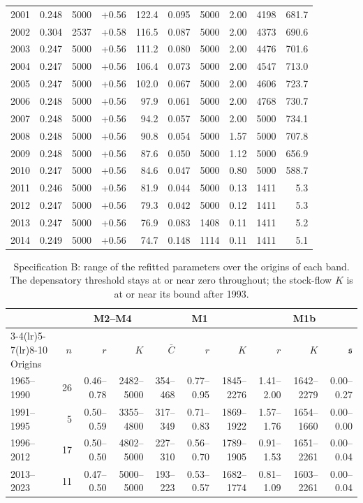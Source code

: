 \documentclass[preprint,11pt,authoryear]{elsarticle}
\theoremstyle{remark}
\newcommand{\sA}{\mathfrak{s}}
\begin{document}
\begin{table}[!htb]
\begin{tabular}{@{}lrrrrrrrrr@{}}
2001 & 0.248 & 5000 & +0.56 & 122.4 & 0.095 & 5000 & 2.00 & 4198 & 681.7 \\
2002 & 0.304 & 2537 & +0.58 & 116.5 & 0.087 & 5000 & 2.00 & 4373 & 690.6 \\
2003 & 0.247 & 5000 & +0.56 & 111.2 & 0.080 & 5000 & 2.00 & 4476 & 701.6 \\
2004 & 0.247 & 5000 & +0.56 & 106.4 & 0.073 & 5000 & 2.00 & 4547 & 713.0 \\
2005 & 0.247 & 5000 & +0.56 & 102.0 & 0.067 & 5000 & 2.00 & 4606 & 723.7 \\
2006 & 0.248 & 5000 & +0.56 & 97.9 & 0.061 & 5000 & 2.00 & 4768 & 730.7 \\
2007 & 0.248 & 5000 & +0.56 & 94.2 & 0.057 & 5000 & 2.00 & 5000 & 734.1 \\
2008 & 0.248 & 5000 & +0.56 & 90.8 & 0.054 & 5000 & 1.57 & 5000 & 707.8 \\
2009 & 0.248 & 5000 & +0.56 & 87.6 & 0.050 & 5000 & 1.12 & 5000 & 656.9 \\
2010 & 0.247 & 5000 & +0.56 & 84.6 & 0.047 & 5000 & 0.80 & 5000 & 588.7 \\
2011 & 0.246 & 5000 & +0.56 & 81.9 & 0.044 & 5000 & 0.13 & 1411 & 5.3 \\
2012 & 0.247 & 5000 & +0.56 & 79.3 & 0.042 & 5000 & 0.12 & 1411 & 5.3 \\
2013 & 0.247 & 5000 & +0.56 & 76.9 & 0.083 & 1408 & 0.11 & 1411 & 5.2 \\
2014 & 0.249 & 5000 & +0.56 & 74.7 & 0.148 & 1114 & 0.11 & 1411 & 5.1 \\
\bottomrule
\end{tabular}
\end{table}

\begin{table}[!htb]
\centering\scriptsize
\setlength{\tabcolsep}{4pt}
\caption{Specification B: range of the refitted parameters over the origins of each band. The depensatory threshold stays at or near zero throughout; the stock-flow $K$ is at or near its bound after 1993.}
\label{tab:si_rollingB}
\begin{tabular}{@{}lrrrrrrrrr@{}}
\toprule
 & & \multicolumn{2}{c}{M2--M4} & \multicolumn{3}{c}{M1} & \multicolumn{3}{c}{M1b} \\
\cmidrule(lr){3-4}\cmidrule(lr){5-7}\cmidrule(lr){8-10}
Origins & $n$ & $r$ & $K$ & $\bar C$ & $r$ & $K$ & $r$ & $K$ & $\sA$ \\
\midrule
1965--1990 & 26 & 0.46--0.78 & 2482--5000 & 354--468 & 0.77--0.95 & 1845--2276 & 1.41--2.00 & 1642--2279 & 0.00--0.27 \\
1991--1995 & 5 & 0.50--0.59 & 3355--4800 & 317--349 & 0.71--0.83 & 1869--1922 & 1.57--1.76 & 1654--1660 & 0.00--0.00 \\
1996--2012 & 17 & 0.50--0.50 & 4802--5000 & 227--310 & 0.56--0.70 & 1789--1905 & 0.91--1.53 & 1651--2261 & 0.00--0.04 \\
2013--2023 & 11 & 0.47--0.50 & 5000--5000 & 193--223 & 0.53--0.57 & 1682--1774 & 0.81--1.09 & 1603--2261 & 0.00--0.04 \\
\bottomrule
\end{tabular}
\end{table}
\end{document}
